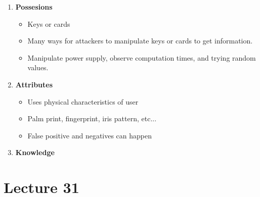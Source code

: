 \documentclass{article}
\begin{document}
		\begin{enumerate}
			\item \textbf{Possesions}
			\begin{itemize}
				\item Keys or cards
				\item Many ways for attackers to manipulate keys or cards to get information.
				\item Manipulate power supply, observe computation times, and trying random values.
			\end{itemize}
			
			\item \textbf{Attributes}
			\begin{itemize}
				\item Uses physical characteristics of user
				\item Palm print, fingerprint, iris pattern, etc...
				\item False positive and negatives can happen
			\end{itemize}
			
			\item \textbf{Knowledge}
		\end{enumerate}
	
	
	
	
	
\section{Lecture 31}
	
\end{document}
